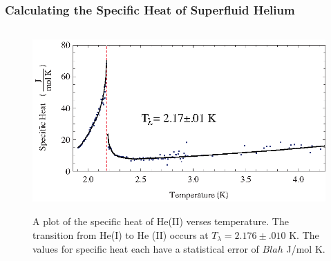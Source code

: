 \subsubsection{Calculating the Specific Heat of Superfluid Helium}\label{calculatingthespecificheatofsuperfluidhelium}

\begin{figure}[htbp]
\begin{center}
\includegraphics[height=70mm]{./figures/lambdatrans.eps}
\caption{\small{A plot of the specific heat of He(II) verses temperature. The transition from He(I) to He (II) occurs at $T_{\lambda} = 2.176 \pm .010$ K.  The values for specific heat each have a statistical error of $Blah$ J/mol K.}}
\label{fig:lambdatrans}
\end{center}
\end{figure}

